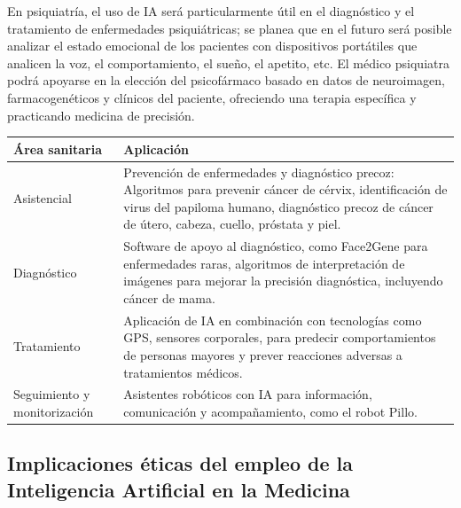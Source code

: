 \documentclass[10pt]{article}
\begin{document}
    
    En psiquiatría, el uso de IA será particularmente útil en el diagnóstico y el tratamiento de enfermedades psiquiátricas; se planea que en el futuro será posible analizar el estado emocional de los pacientes con dispositivos portátiles que analicen la voz, el comportamiento, el sueño, el apetito, etc. El médico psiquiatra podrá apoyarse en la elección del psicofármaco basado en datos de neuroimagen, farmacogenéticos y clínicos del paciente, ofreciendo una terapia específica y practicando medicina de precisión. \cite{lanzagorta-ortega_inteligencia_2023}

    
\vspace{0.5cm}
        \begin{tabularx}{0.8\textwidth} { |m{2.3cm}| m{9.7cm} |}
        \hline
        \textbf{Área sanitaria} &\textbf{Aplicación} 
        \\
        \hline
        {Asistencial} & {Prevención de enfermedades y diagnóstico precoz: Algoritmos para prevenir cáncer de cérvix, identificación de virus del papiloma humano, diagnóstico precoz de cáncer de útero, cabeza, cuello, próstata y piel.} \\ 
        \hline                            
        {Diagnóstico} & {Software de apoyo al diagnóstico, como Face2Gene para enfermedades raras, algoritmos de interpretación de imágenes para mejorar la precisión diagnóstica, incluyendo cáncer de mama.} \\ 
        \hline
        {Tratamiento} & {Aplicación de IA en combinación con tecnologías como GPS, sensores corporales, para predecir comportamientos de personas mayores y prever reacciones adversas a tratamientos médicos.} \\ 
        \hline
        {Seguimiento y monitorización} & {Asistentes robóticos con IA para información, comunicación y acompañamiento, como el robot Pillo.}  \\
        \hline
        \end{tabularx} 
        
        \caption{Tabla 1: Resumen de la aplicación de IA en las diferentes áreas sanitarias}
        \label{tab:1}
        
\vspace{0.5cm}
\begin{center}
    \section{Implicaciones éticas del empleo de la Inteligencia Artificial en la Medicina}
\end{center}
\end{document}
